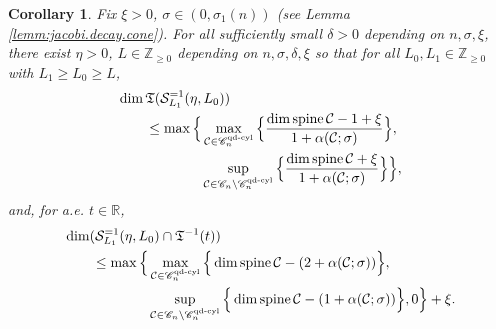 \documentclass[11pt, letterpaper, reqno]{amsart}
\numberwithin{equation}{section}
\newtheorem{Cor}[Def]{Corollary}
\theoremstyle{remark}
\newcommand{\RR}{\mathbb{R}}
\newcommand{\ZZ}{\mathbb{Z}}
\newcommand{\cC}{\mathcal{C}}
\newcommand{\cS}{\mathcal{S}}
\newcommand{\frT}{\mathfrak{T}}
\newcommand{\spine}{\operatorname{spine}}
\begin{document}
\begin{Cor} \label{coro:lf.nonqd.points}
	Fix $\xi > 0$, $\sigma \in (0, \sigma_1(n))$ (see Lemma \ref{lemm:jacobi.decay.cone}). For all  sufficiently small $\delta > 0$ depending on $n, \sigma, \xi$, there exist $\eta > 0$, $L \in \ZZ_{\geq 0}$ depending on $n, \sigma, \delta, \xi$ so that for all $L_0, L_1 \in \ZZ_{\geq 0}$ with $L_1 \geq L_0 \geq L$,
	\begin{align} \label{eq:lf.nonqd.points.dim.epsilon}
		& \dim \frT(\cS^{=1}_{L_1}(\eta, L_0)) \nonumber \\
		& \qquad \leq \max \Big\{ \max_{\cC \in \mathscr{C}_{n}^{\textnormal{qd-cyl}}} \Big\{ \frac{\dim \spine \cC - 1 + \xi}{1 + \alpha(\cC; \sigma)} \Big\}, \nonumber \\
		& \qquad \qquad \qquad \sup_{\cC \in \mathscr{C}_n \setminus \mathscr{C}_n^{\textnormal{qd-cyl}}} \Big\{ \frac{\dim \spine \cC + \xi}{1 + \alpha(\cC; \sigma)} \Big\} \Big\},
	\end{align}
	and, for a.e. $t \in \RR$,
	\begin{align} \label{eq:lf.nonqd.points.codim.epsilon}
		& \dim (\cS^{=1}_{L_1}(\eta, L_0) \cap \frT^{-1}(t)) \nonumber \\
		& \qquad \leq \max \Big\{ \max_{\cC \in \mathscr{C}_{n}^{\textnormal{qd-cyl}}} \Big\{ \dim \spine \cC -(2+\alpha(\cC; \sigma)) \Big\}, \nonumber \\
		& \qquad \qquad \qquad \sup_{\cC \in \mathscr{C}_n \setminus \mathscr{C}_n^{\textnormal{qd-cyl}}} \Big\{ \dim \spine \cC - (1 + \alpha(\cC; \sigma)) \Big\}, 0 \Big\} + \xi.
	\end{align}
\end{Cor}
\end{document}
